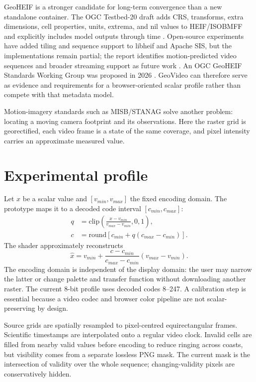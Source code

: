 \documentclass[11pt]{article}
\begin{document}
GeoHEIF is a stronger candidate for long-term convergence than a new standalone container. The OGC Testbed-20 draft adds CRS, transforms, extra dimensions, cell properties, units, extrema, and nil values to HEIF/ISOBMFF and explicitly includes model outputs through time \cite{geoheif}. Open-source experiments have added tiling and sequence support to libheif and Apache SIS, but the implementations remain partial; the report identifies motion-predicted video sequences and broader streaming support as future work \cite{geoheifoss}. An OGC GeoHEIF Standards Working Group was proposed in 2026 \cite{geoheifswg}. GeoVideo can therefore serve as evidence and requirements for a browser-oriented scalar profile rather than compete with that metadata model.

Motion-imagery standards such as MISB/STANAG solve another problem: locating a moving camera footprint and its observations. Here the raster grid is georectified, each video frame is a state of the same coverage, and pixel intensity carries an approximate measured value.

\section{Experimental profile}
Let $x$ be a scalar value and $[v_{min},v_{max}]$ the fixed encoding domain. The prototype maps it to a decoded code interval $[c_{min},c_{max}]$:
\begin{equation}
\begin{split}
q &= \mathrm{clip}\!\left(\frac{x-v_{min}}{v_{max}-v_{min}},0,1\right),\\
c &= \mathrm{round}\!\left[c_{min}+q(c_{max}-c_{min})\right].
\end{split}
\end{equation}
The shader approximately reconstructs
\begin{equation}
\hat{x}=v_{min}+\frac{c-c_{min}}{c_{max}-c_{min}}(v_{max}-v_{min}).
\end{equation}
The encoding domain is independent of the display domain: the user may narrow the latter or change palette and transfer function without downloading another raster. The current 8-bit profile uses decoded codes 8--247. A calibration step is essential because a video codec and browser color pipeline are not scalar-preserving by design.

Source grids are spatially resampled to pixel-centred equirectangular frames. Scientific timestamps are interpolated onto a regular video clock. Invalid cells are filled from nearby valid values before encoding to reduce ringing across coasts, but visibility comes from a separate lossless PNG mask. The current mask is the intersection of validity over the whole sequence; changing-validity pixels are conservatively hidden.
\end{document}
